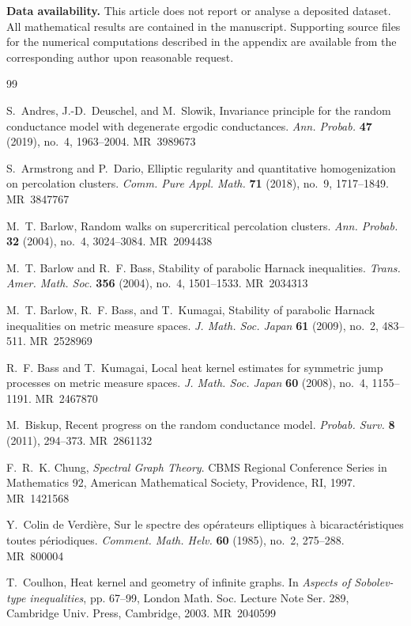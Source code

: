 \documentclass[reqno]{amsart}
\providecommand{\MR}[1]{\textsc{MR}~#1}
\numberwithin{equation}{section}
\theoremstyle{definition}
\theoremstyle{remark}
\begin{document}
\medskip
\noindent\textbf{Data availability.} This article does not report or analyse a deposited dataset. All mathematical results are contained in the manuscript. Supporting source files for the numerical computations described in the appendix are available from the corresponding author upon reasonable request.

\begin{thebibliography}{99}

S.~Andres, J.-D.~Deuschel, and M.~Slowik, Invariance principle for the random conductance model with degenerate ergodic conductances.
\emph{Ann. Probab.} \textbf{47} (2019), no.~4, 1963--2004.
\MR{3989673}

S.~Armstrong and P.~Dario, Elliptic regularity and quantitative homogenization on percolation clusters.
\emph{Comm. Pure Appl. Math.} \textbf{71} (2018), no.~9, 1717--1849.
\MR{3847767}

M.~T. Barlow, Random walks on supercritical percolation clusters.
\emph{Ann. Probab.} \textbf{32} (2004), no.~4, 3024--3084.
\MR{2094438}

M.~T. Barlow and R.~F. Bass, Stability of parabolic Harnack inequalities.
\emph{Trans. Amer. Math. Soc.} \textbf{356} (2004), no.~4, 1501--1533.
\MR{2034313}

M.~T. Barlow, R.~F. Bass, and T.~Kumagai, Stability of parabolic Harnack inequalities on metric measure spaces.
\emph{J. Math. Soc. Japan} \textbf{61} (2009), no.~2, 483--511.
\MR{2528969}

R.~F. Bass and T.~Kumagai, Local heat kernel estimates for symmetric jump processes on metric measure spaces.
\emph{J. Math. Soc. Japan} \textbf{60} (2008), no.~4, 1155--1191.
\MR{2467870}

M.~Biskup, Recent progress on the random conductance model.
\emph{Probab. Surv.} \textbf{8} (2011), 294--373.
\MR{2861132}

F.~R.~K. Chung, \emph{Spectral Graph Theory}.
CBMS Regional Conference Series in Mathematics 92, American Mathematical Society, Providence, RI, 1997.
\MR{1421568}

Y.~Colin de Verdière, Sur le spectre des opérateurs elliptiques à bicaractéristiques toutes périodiques.
\emph{Comment. Math. Helv.} \textbf{60} (1985), no.~2, 275--288.
\MR{800004}

T.~Coulhon, Heat kernel and geometry of infinite graphs.
In \emph{Aspects of Sobolev-type inequalities},
pp. 67--99, London Math. Soc. Lecture Note Ser. 289,
Cambridge Univ. Press, Cambridge, 2003.
\MR{2040599}


\end{thebibliography}
\end{document}

